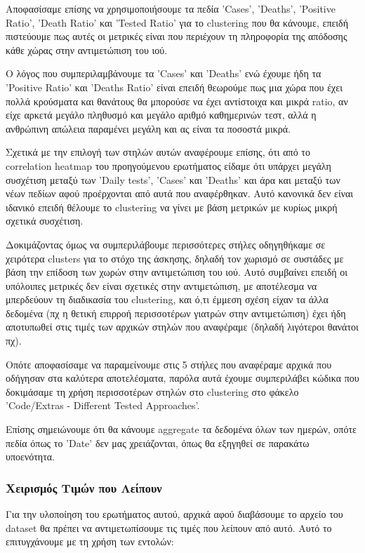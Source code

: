 \documentclass[12pt,a4paper]{article}
\begin{document}
Αποφασίσαμε επίσης να χρησιμοποιήσουμε τα πεδία 'Cases', 'Deaths', 'Positive Ratio', 'Death Ratio' και 'Tested Ratio' για το clustering που θα κάνουμε, επειδή πιστεύουμε πως αυτές οι μετρικές είναι που περιέχουν τη πληροφορία της απόδοσης κάθε χώρας στην αντιμετώπιση του ιού.

Ο λόγος που συμπεριλαμβάνουμε τα 'Cases' και 'Deaths' ενώ έχουμε ήδη τα 'Positive Ratio' και 'Deaths Ratio' είναι επειδή θεωρούμε πως μια χώρα που έχει πολλά κρούσματα και θανάτους θα μπορούσε να έχει αντίστοιχα και μικρά ratio, αν είχε αρκετά μεγάλο πληθυσμό και μεγάλο αριθμό καθημερινών τεστ, αλλά η ανθρώπινη απώλεια παραμένει μεγάλη και ας είναι τα ποσοστά μικρά.

Σχετικά με την επιλογή των στηλών αυτών αναφέρουμε επίσης, ότι από το correlation heatmap του προηγούμενου ερωτήματος είδαμε ότι υπάρχει μεγάλη συσχέτιση μεταξύ των 'Daily tests', 'Cases' και 'Deaths' και άρα και μεταξύ των νέων πεδίων αφού προέρχονται από αυτά που αναφέρθηκαν. Αυτό κανονικά δεν είναι ιδανικό επειδή θέλουμε το clustering να γίνει με βάση μετρικών με κυρίως μικρή σχετικά συσχέτιση. 

Δοκιμάζοντας όμως να συμπεριλάβουμε περισσότερες στήλες οδηγηθήκαμε σε χειρότερα clusters για το στόχο της άσκησης, δηλαδή τον χωρισμό σε συστάδες με βάση την επίδοση των χωρών στην αντιμετώπιση του ιού. Αυτό συμβαίνει επειδή οι υπόλοιπες μετρικές δεν είναι σχετικές στην αντιμετώπιση, με αποτέλεσμα να μπερδεύουν τη διαδικασία του clustering, και ό,τι έμμεση σχέση είχαν τα άλλα δεδομένα (πχ η θετική επιρροή περισσοτέρων γιατρών στην αντιμετώπιση) έχει ήδη αποτυπωθεί στις τιμές των αρχικών στηλών που αναφέραμε (δηλαδή λιγότεροι θανάτοι πχ).

Οπότε αποφασίσαμε να παραμείνουμε στις 5 στήλες που αναφέραμε αρχικά που οδήγησαν στα καλύτερα αποτελέσματα, παρόλα αυτά έχουμε συμπεριλάβει κώδικα που δοκιμάσαμε τη χρήση περισσοτέρων στηλών στο clustering στο φάκελο 'Code/Extras - Different Tested Approaches'.

Επίσης σημειώνουμε ότι θα κάνουμε aggregate τα δεδομένα όλων των ημερών, οπότε πεδία όπως το 'Date' δεν μας χρειάζονται, όπως θα εξηγηθεί σε παρακάτω υποενότητα.

\subsubsection{Χειρισμός Τιμών που Λείπουν}

Για την υλοποίηση του ερωτήματος αυτού, αρχικά αφού διαβάσουμε το αρχείο του dataset θα πρέπει να αντιμετωπίσουμε τις τιμές που λείπουν από αυτό. Αυτό το επιτυγχάνουμε με τη χρήση των εντολών:
\end{document}
